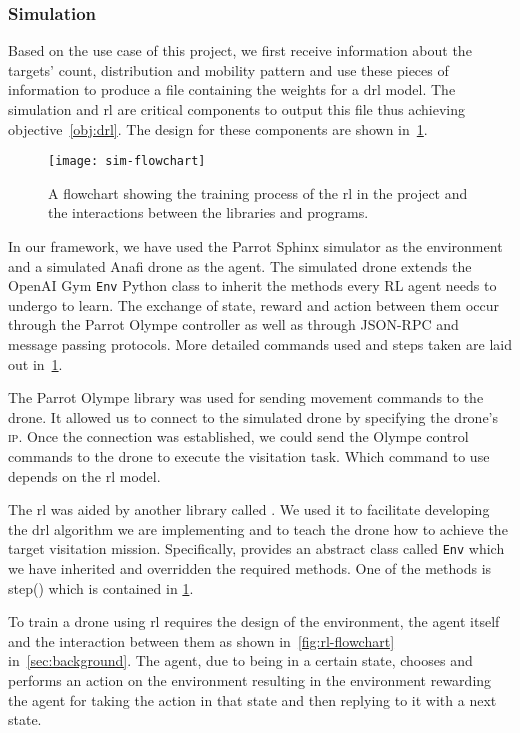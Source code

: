 \documentclass[../main.tex]{subfiles}
\begin{document}
\subsubsection{Simulation}
Based on the use case of this project, we first receive information
about the targets' count, distribution and mobility pattern and use
these pieces of
information to produce a file containing the weights for a \gls{drl}
model.
The simulation and \gls{rl} are critical
components to output this file thus achieving objective~\ref{obj:drl}.
The design for these components are shown in~\cref{fig:sim-flowchart}.

\begin{figure}[p]
    \centering
    \texttt{[image: sim-flowchart]}
    \caption{A flowchart showing the training process
        of the \gls{rl} in the project
        and the interactions between the libraries
        and programs.}
    \label{fig:sim-flowchart}
\end{figure}

In our framework, we have used the Parrot Sphinx simulator
as the environment and a simulated Anafi drone as the agent.
The simulated drone extends the OpenAI Gym \texttt{Env} 
Python class
to inherit the methods every RL agent
needs to undergo to learn.
The exchange of state, reward and action between them 
occur through the Parrot Olympe controller as well as
through JSON-RPC and message passing protocols.
More detailed commands used and steps taken are laid out 
in~\cref{fig:sim-flowchart}.

The Parrot Olympe library was used for sending movement commands to
the drone.
It allowed us to connect
to the simulated drone by specifying the drone's
\textsc{ip}. Once the connection was established, 
we could send the Olympe control commands to the drone
to execute the visitation task. 
Which command to use
depends on the \gls{rl} model.

The \gls{rl} was aided 
by another library called \gym.
We used it to facilitate developing the
\gls{drl} algorithm we are implementing and to 
teach the drone how to achieve the 
target visitation mission.
Specifically, \gym provides an abstract class 
called \texttt{Env}
which we have inherited and overridden the 
required methods.
One of the methods is step() which is contained in
\cref{fig:sim-flowchart}.

To train a drone using \gls{rl} requires the
design of the environment, the agent itself and
the interaction between them as shown in~\cref{fig:rl-flowchart}
in~\cref{sec:background}. 
The agent, due to being in a certain state, chooses and 
performs an action on
the environment resulting in the environment 
rewarding the agent for taking the action in that state
and then replying to it with a next state.
\end{document}
